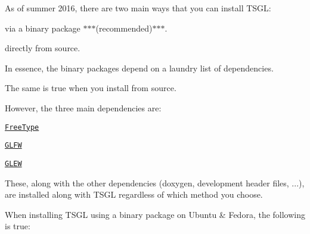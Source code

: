 As of summer 2016, there are two main ways that you can install T\-S\-G\-L\-:


\begin{DoxyItemize}
\item via a binary package $\ast$$\ast$$\ast$(recommended)$\ast$$\ast$$\ast$.
\item directly from source.
\end{DoxyItemize}

In essence, the binary packages depend on a laundry list of dependencies.

The same is true when you install from source.

However, the three main dependencies are\-:


\begin{DoxyItemize}
\item \href{https://www.freetype.org/download.html}{\tt Free\-Type}
\item \href{https://www.glfw.org/download.html}{\tt G\-L\-F\-W}
\item \href{https://downloads.sourceforge.net/project/glew/glew/1.12.0/glew-1.12.0.zip}{\tt G\-L\-E\-W}
\end{DoxyItemize}

These, along with the other dependencies ({\ttfamily doxygen}, development header files, ...), are installed along with T\-S\-G\-L regardless of which method you choose.

When installing T\-S\-G\-L using a binary package on Ubuntu \& Fedora, the following is true\-:


